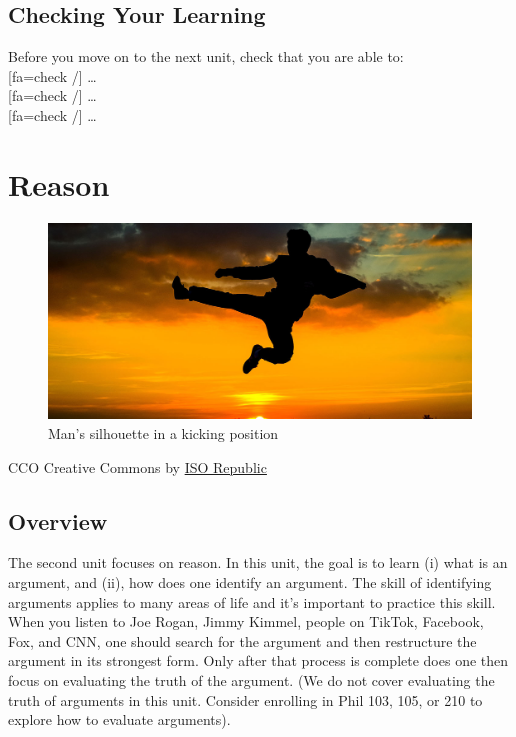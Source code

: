 \documentclass[
]{book}
\begin{document}
\hypertarget{checking-your-learning}{%
\section{Checking Your Learning}\label{checking-your-learning}}

Before you move on to the next unit, check that you are able to:\\
{[}fa=check /{]} \ldots{}\\
{[}fa=check /{]} \ldots{}\\
{[}fa=check /{]} \ldots{}

\hypertarget{reason}{%
\chapter{Reason}\label{reason}}

\begin{figure}
\centering
\includegraphics{assets/u2/Unit2Overview.jpg}
\caption{Man's silhouette in a kicking position}
\end{figure}

CCO Creative Commons by \href{https://isorepublic.com/photo/flying-kick/}{ISO Republic}

\hypertarget{overview-1}{%
\section{Overview}\label{overview-1}}

The second unit focuses on reason. In this unit, the goal is to learn (i) what is an argument, and (ii), how does one identify an argument. The skill of identifying arguments applies to many areas of life and it's important to practice this skill. When you listen to Joe Rogan, Jimmy Kimmel, people on TikTok, Facebook, Fox, and CNN, one should search for the argument and then restructure the argument in its strongest form. Only after that process is complete does one then focus on evaluating the truth of the argument. (We do not cover evaluating the truth of arguments in this unit. Consider enrolling in Phil 103, 105, or 210 to explore how to evaluate arguments).
\end{document}
